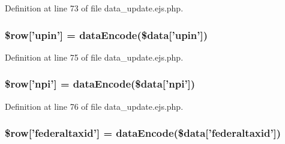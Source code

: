 \-Definition at line 73 of file data\-\_\-update.\-ejs.\-php.

\hypertarget{miscellaneous_2mysettings_2data__update_8ejs_8php_aaa10113ab6f803b651bde517d2c22961}{
\subsubsection[{\$row}]{\setlength{\rightskip}{0pt plus 5cm}\$row\mbox{[}'upin'\mbox{]} = {\bf data\-Encode}(\$data\mbox{[}'upin'\mbox{]})}}\label{miscellaneous_2mysettings_2data__update_8ejs_8php_aaa10113ab6f803b651bde517d2c22961}


\-Definition at line 75 of file data\-\_\-update.\-ejs.\-php.

\hypertarget{miscellaneous_2mysettings_2data__update_8ejs_8php_ae8acb53d6d8e83580307a5aa95fd2304}{
\subsubsection[{\$row}]{\setlength{\rightskip}{0pt plus 5cm}\$row\mbox{[}'npi'\mbox{]} = {\bf data\-Encode}(\$data\mbox{[}'npi'\mbox{]})}}\label{miscellaneous_2mysettings_2data__update_8ejs_8php_ae8acb53d6d8e83580307a5aa95fd2304}


\-Definition at line 76 of file data\-\_\-update.\-ejs.\-php.

\hypertarget{miscellaneous_2mysettings_2data__update_8ejs_8php_a276b7e7d1682582d07599773e5677ad1}{
\subsubsection[{\$row}]{\setlength{\rightskip}{0pt plus 5cm}\$row\mbox{[}'federaltaxid'\mbox{]} = {\bf data\-Encode}(\$data\mbox{[}'federaltaxid'\mbox{]})}}\label{miscellaneous_2mysettings_2data__update_8ejs_8php_a276b7e7d1682582d07599773e5677ad1}


